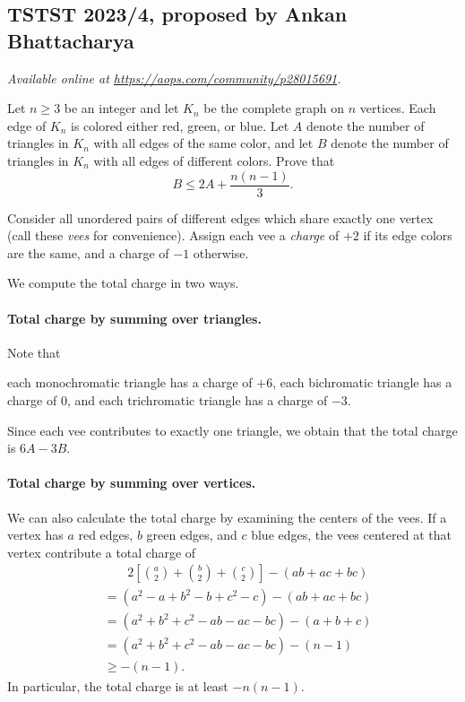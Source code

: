 \documentclass[11pt]{scrartcl}
\begin{document}
\subsection{TSTST 2023/4, proposed by Ankan Bhattacharya}
\textsl{Available online at \url{https://aops.com/community/p28015691}.}
\begin{mdframed}[style=mdpurplebox,frametitle={Problem statement}]
Let $n \ge 3$ be an integer and let $K_n$ be the complete graph on $n$ vertices.
Each edge of $K_n$ is colored either red, green, or blue.
Let $A$ denote the number of triangles in $K_n$
with all edges of the same color, and
let $B$ denote the number of triangles in $K_n$
with all edges of different colors.
Prove that
\[ B \le 2A + \frac{n(n-1)}3. \]
\end{mdframed}
Consider all unordered pairs of different edges which share exactly one vertex
(call these \emph{vees} for convenience).
Assign each vee a \emph{charge} of $+2$ if its edge colors are the same,
and a charge of $-1$ otherwise.

We compute the total charge in two ways.

\paragraph{Total charge by summing over triangles.}
Note that
\begin{itemize}
  \ii each monochromatic triangle has a charge of $+6$,
  \ii each bichromatic triangle has a charge of $0$, and
  \ii each trichromatic triangle has a charge of $-3$.
\end{itemize}
Since each vee contributes to exactly one triangle,
we obtain that the total charge is $6A - 3B$.

\paragraph{Total charge by summing over vertices.}
We can also calculate the total charge by examining the centers of the vees.
If a vertex has $a$ red edges, $b$ green edges, and $c$ blue edges,
the vees centered at that vertex contribute a total charge of
\begin{align*}
  & \phantom{=}\;\; 2\left[ \binom a2 + \binom b2 + \binom c2\right] - (ab + ac + bc)\\
  & = (a^2 - a + b^2 - b + c^2 - c) - (ab + ac + bc)\\
  & = (a^2 + b^2 + c^2 - ab - ac - bc) - (a + b + c)\\
  & = (a^2 + b^2 + c^2 - ab - ac - bc) - (n-1)\\
  & \ge -(n-1).
\end{align*}
In particular, the total charge is at least $-n(n-1)$.
\end{document}
